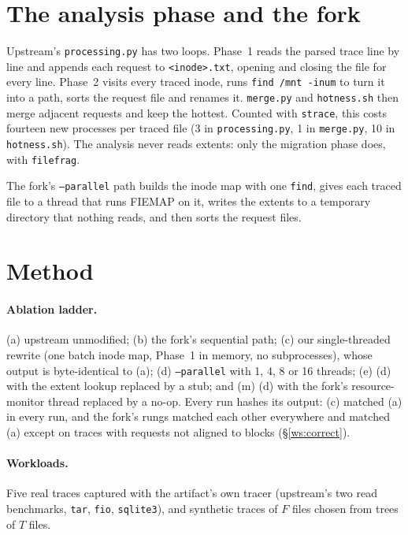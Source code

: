 \section{The analysis phase and the fork}
\label{ws:bg}

Upstream's \texttt{processing.py} has two loops. Phase~1 reads the parsed trace line by
line and appends each request to \texttt{<inode>.txt}, opening and closing the file for
every line. Phase~2 visits every traced inode, runs \texttt{find /mnt -inum} to turn it
into a path, sorts the request file and renames it. \texttt{merge.py} and
\texttt{hotness.sh} then merge adjacent requests and keep the hottest. Counted with
\texttt{strace}, this costs fourteen new processes per traced file (3 in
\texttt{processing.py}, 1 in \texttt{merge.py}, 10 in \texttt{hotness.sh}). The
analysis never reads extents: only the migration phase does, with \texttt{filefrag}.

The fork's \texttt{--parallel} path builds the inode map with one \texttt{find}, gives
each traced file to a thread that runs FIEMAP on it, writes the extents to a temporary
directory that nothing reads, and then sorts the request files.

\section{Method}
\label{ws:method}

\paragraph{Ablation ladder.} (a) upstream unmodified; (b) the fork's sequential path;
(c) our single-threaded rewrite (one batch inode map, Phase~1 in memory, no
subprocesses), whose output is byte-identical to (a); (d) \texttt{--parallel} with 1, 4,
8 or 16 threads; (e) (d) with the extent lookup replaced by a stub; and (m) (d) with the
fork's resource-monitor thread replaced by a no-op. Every run hashes its output: (c)
matched (a) in every run, and the fork's rungs matched each other everywhere and matched
(a) except on traces with requests not aligned to blocks (\S\ref{ws:correct}).

\paragraph{Workloads.} Five real traces captured with the artifact's own tracer
(upstream's two read benchmarks, \texttt{tar}, \texttt{fio}, \texttt{sqlite3}), and
synthetic traces of $F$ files chosen from trees of $T$ files.

